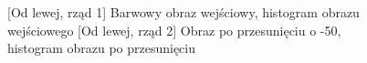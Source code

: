 \documentclass[a4paper,12pt, titlepage]{report}
\begin{document}
\FloatBarrier
\begin{figure}[h]
    \centering
    \qquad
    \caption{[Od lewej, rząd 1] Barwowy obraz wejściowy, histogram obrazu wejściowego [Od lewej, rząd 2] Obraz po przesunięciu o -50, histogram obrazu po przesunięciu}%
    \label{fig:rysunek}%
\end{figure}
\FloatBarrier
\end{document}
